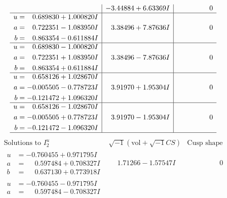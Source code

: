 \documentclass[1p]{elsarticle_modified}
\theoremstyle{definition}
\newcommand{\I}{\sqrt{-1}}
\begin{document}
$$\begin{array}{c|c|c}
 & -3.44884 + 6.63369 I & \phantom{-0.000000 } 0 \\ \hline\begin{aligned}
u &= \phantom{-}0.689830 + 1.000820 I \\
a &= \phantom{-}0.722351 - 1.083950 I \\
b &= \phantom{-}0.863354 - 0.611884 I\end{aligned}
 & \phantom{-}3.38496 + 7.87636 I & \phantom{-0.000000 } 0 \\ \hline\begin{aligned}
u &= \phantom{-}0.689830 - 1.000820 I \\
a &= \phantom{-}0.722351 + 1.083950 I \\
b &= \phantom{-}0.863354 + 0.611884 I\end{aligned}
 & \phantom{-}3.38496 - 7.87636 I & \phantom{-0.000000 } 0 \\ \hline\begin{aligned}
u &= \phantom{-}0.658126 + 1.028670 I \\
a &= -0.005505 - 0.778723 I \\
b &= -0.121472 + 1.096320 I\end{aligned}
 & \phantom{-}3.91970 + 1.95304 I & \phantom{-0.000000 } 0 \\ \hline\begin{aligned}
u &= \phantom{-}0.658126 - 1.028670 I \\
a &= -0.005505 + 0.778723 I \\
b &= -0.121472 - 1.096320 I\end{aligned}
 & \phantom{-}3.91970 - 1.95304 I & \phantom{-0.000000 } 0\\
 \hline 
 \end{array}$$\newpage$$\begin{array}{c|c|c}  
\text{Solutions to }I^u_{2}& \I (\text{vol} + \sqrt{-1}CS) & \text{Cusp shape}\\
 \hline 
\begin{aligned}
u &= -0.760455 + 0.971795 I \\
a &= \phantom{-}0.597484 + 0.708327 I \\
b &= \phantom{-}0.637130 + 0.773918 I\end{aligned}
 & \phantom{-}1.71266 - 1.57547 I & \phantom{-0.000000 } 0 \\ \hline\begin{aligned}
u &= -0.760455 - 0.971795 I \\
a &= \phantom{-}0.597484 - 0.708327 I \\

\end{aligned}
\end{array}$$
\end{document}
